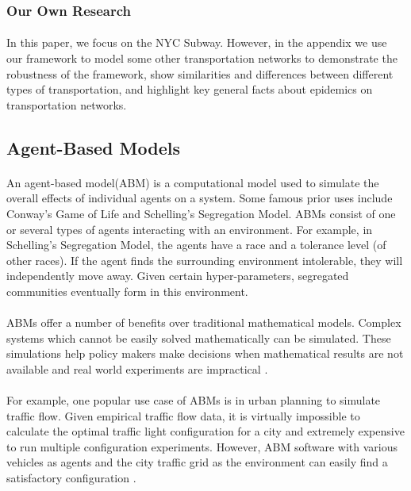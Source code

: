 \documentclass[12pt, a4, epsf] {article}
\theoremstyle{plain}
\theoremstyle{definition}
\begin{document}
\subsubsection{Our Own Research}
\paragraph{}
In this paper, we focus on the NYC Subway. However, in the appendix we use our framework to model some other transportation networks to demonstrate the robustness of the framework, show similarities and differences between different types of transportation, and highlight key general facts about epidemics on transportation networks.
\subsection{Agent-Based Models}
\paragraph{}
An agent-based model(ABM) is a computational model used to simulate the overall effects of individual agents on a system. Some famous prior uses include Conway's Game of Life and Schelling's Segregation Model\cite{schelling_1971}. ABMs consist of one or several types of agents interacting with an environment. For example, in Schelling's Segregation Model, the agents have a race and a tolerance level (of other races). If the agent finds the surrounding environment intolerable, they will independently move away. Given certain hyper-parameters, segregated communities eventually form in this environment.
\paragraph{}
ABMs offer a number of benefits over traditional mathematical models. Complex systems which cannot be easily solved mathematically can be simulated. These simulations help policy makers make decisions when mathematical results are not available and real world experiments are impractical \cite{medicine_geller_ogawa_wallace_2015}. \\
\paragraph{}
For example, one popular use case of ABMs is in urban planning to simulate traffic flow. Given empirical traffic flow data, it is virtually impossible to calculate the optimal traffic light configuration for a city and extremely expensive to run multiple configuration experiments. However, ABM software with various vehicles as agents and the city traffic grid as the environment can easily find a satisfactory configuration \cite{traffic_book_2014}.
\end{document}
